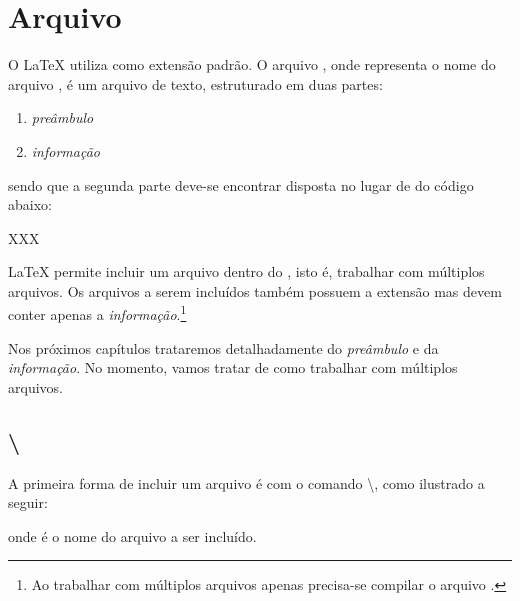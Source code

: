% 
% 
% 
% 
% 
\chapter{Arquivo } \label{sch:latex:tex}
O LaTeX utiliza  como extensão padrão. O arquivo , onde  representa o nome do arquivo , é um arquivo de texto, estruturado em duas partes:
\begin{enumerate}
    \item \textit{preâmbulo}
    \item \textit{informação}
\end{enumerate}
sendo que a segunda parte deve-se encontrar disposta no lugar de  do código abaixo:
\begin{latexcode}
    
    XXX
    
\end{latexcode}

LaTeX permite incluir um arquivo dentro do , isto é, trabalhar com múltiplos arquivos. Os arquivos a serem incluídos também possuem a extensão  mas devem conter apenas a \textit{informação}.\footnote{Ao trabalhar com múltiplos arquivos apenas precisa-se compilar o arquivo .}

Nos próximos capítulos trataremos detalhadamente do \textit{preâmbulo} e da \textit{informação}. No momento, vamos tratar de como trabalhar com múltiplos arquivos.

\section{\textbackslash{}}

A primeira forma de incluir um arquivo é com o comando \textbackslash{}, como ilustrado a seguir:
\begin{latexcode}
    
\end{latexcode}
onde  é o nome do arquivo a ser incluído.

